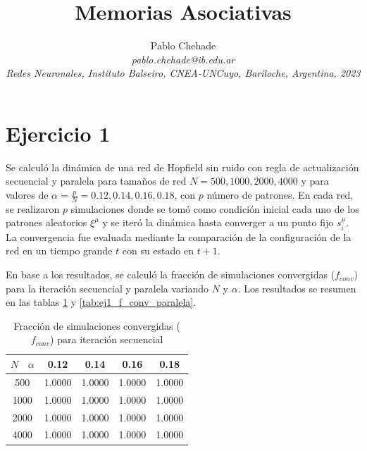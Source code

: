 \documentclass[aps,prb,twocolumn,superscriptaddress,floatfix,longbibliography]{revtex4-2}
\newcounter{para}
\begin{document}
\newcommand{\mytitle}{Memorias Asociativas}

\title{\mytitle}

\author{Pablo Chehade \\
    \small \textit{pablo.chehade@ib.edu.ar} \\
    \small \textit{Redes Neuronales, Instituto Balseiro, CNEA-UNCuyo, Bariloche, Argentina, 2023} \\}
    
\maketitle


\section*{Ejercicio 1}



Se calculó la dinámica de una red de Hopfield sin ruido con regla de actualización secuencial y paralela para tamaños de red \( N = 500, 1000, 2000, 4000 \) y para valores de \( \alpha = \frac{p}{N} = 0.12, 0.14, 0.16, 0.18 \), con $p$ número de patrones. En cada red, se realizaron \( p \) simulaciones donde se tomó como condición inicial cada uno de los patrones aleatorios $\xi^\mu$ y se iteró la dinámica hasta converger a un punto fijo \( s_i^{\mu} \). La convergencia fue evaluada mediante la comparación de la configuración de la red en un tiempo grande \( t \) con su estado en \( t+1 \).

En base a los resultados, se calculó la fracción de simulaciones convergidas (\( f_{conv} \)) para la iteración secuencial y paralela variando $N$ y $\alpha$. Los resultados se resumen en las tablas \ref{tab:ej1_f_conv_secuencial} y \ref{tab:ej1_f_conv_paralela}.

\begin{table}[h]
  \centering
  \caption{Fracción de simulaciones convergidas (\( f_{conv} \)) para iteración secuencial}
  \label{tab:ej1_f_conv_secuencial}
  \begin{tabular}{|c|c|c|c|c|}
  \hline
  \( N \) \ \( \alpha \) & 0.12   & 0.14   & 0.16   & 0.18   \\ \hline
  500            & 1.0000 & 1.0000 & 1.0000 & 1.0000 \\ \hline
  1000           & 1.0000 & 1.0000 & 1.0000 & 1.0000 \\ \hline
  2000           & 1.0000 & 1.0000 & 1.0000 & 1.0000 \\ \hline
  4000           & 1.0000 & 1.0000 & 1.0000 & 1.0000 \\ \hline
  \end{tabular}
\end{table}
  
\end{document}
